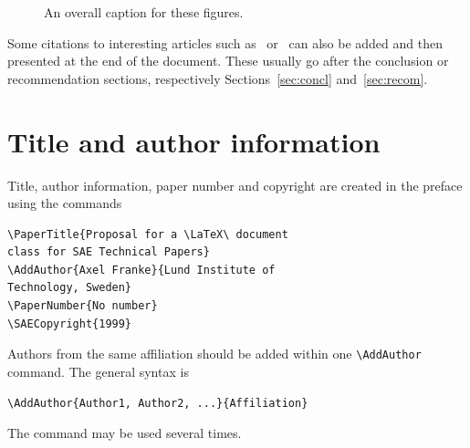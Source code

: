 \documentclass[letterpaper,times]{sae}
\begin{document}
\begin{figure}[!htb]
\hspace{.01\textwidth}
%
\caption{An overall caption for these figures.}
\label{fig:sampleFigure2}
\end{figure}

Some citations to interesting articles such as~\cite{GAGNON-OFW11-2016} or~\cite{gagAHS2014} can also be
added and then presented at the end of the document. These usually go after the conclusion or recommendation sections, respectively Sections~\ref{sec:concl} and~\ref{sec:recom}.



\section{Title and author information}
Title, author information, paper number and copyright are created in the
preface using the commands
\begin{verbatim}
\PaperTitle{Proposal for a \LaTeX\ document 
class for SAE Technical Papers}
\AddAuthor{Axel Franke}{Lund Institute of 
Technology, Sweden}
\PaperNumber{No number}
\SAECopyright{1999}
\end{verbatim}
Authors from the same affiliation should be added within one
\verb+\AddAuthor+ command. The general syntax is
\begin{verbatim}
\AddAuthor{Author1, Author2, ...}{Affiliation}
\end{verbatim}
The command may be used several times.
\end{document}
